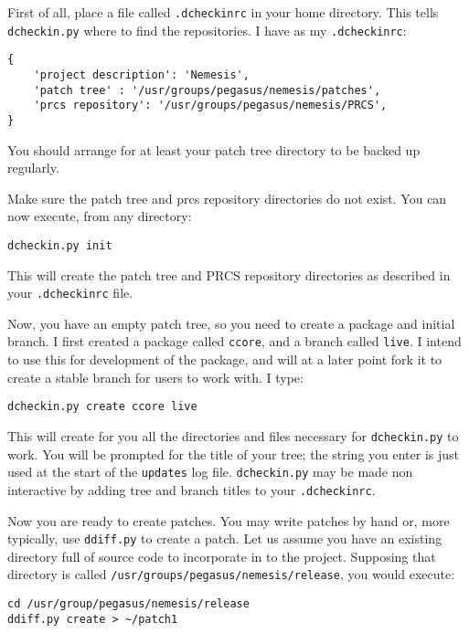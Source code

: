 \documentclass{article}
\begin{document}
First of all, place a file called \texttt{.dcheckinrc} in your home
directory. This tells \texttt{dcheckin.py} where to find the
repositories. I have as my \texttt{.dcheckinrc}:

\begin{verbatim}
{
    'project description': 'Nemesis',
    'patch tree' : '/usr/groups/pegasus/nemesis/patches',
    'prcs repository': '/usr/groups/pegasus/nemesis/PRCS',
}
\end{verbatim}

You should arrange for at least your patch tree directory to be backed
up regularly. 

Make sure the patch tree and prcs repository directories do not
exist. You can now execute, from any directory:

\begin{verbatim}
dcheckin.py init
\end{verbatim}

This will create the patch tree and PRCS repository directories as
described in your \texttt{.dcheckinrc} file.

Now, you have an empty patch tree, so you need to create a package and
initial branch. I first created a package called \texttt{ccore}, and a
branch called \texttt{live}. I intend to use this for development of
the package, and will at a later point fork it to create a stable
branch for users to work with. I type:

\begin{verbatim}
dcheckin.py create ccore live
\end{verbatim}

This will create for you all the directories and files necessary for
\texttt{dcheckin.py} to work. You will be prompted for the title of your tree;
the string you enter is just used at the start of the \texttt{updates}
log file. \texttt{dcheckin.py} may be made non interactive by adding
tree and branch titles to your \texttt{.dcheckinrc}.

Now you are ready to create patches. You may write patches by hand or,
more typically, use \texttt{ddiff.py} to create a patch. Let us assume
you have an existing directory full of source code to incorporate in
to the project. Supposing that directory is called
\texttt{/usr/groups/pegasus/nemesis/release}, you would execute:

\begin{verbatim}
cd /usr/group/pegasus/nemesis/release
ddiff.py create > ~/patch1
\end{verbatim}
\end{document}
